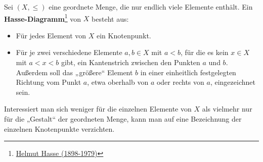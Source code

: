 \begin{defin} \label{def:hasse} 
    Sei $(X,\le)$ eine geordnete Menge, die nur endlich viele Elemente enthält. Ein \textbf{Hasse-Diagramm}\footnote{\href{https://de.wikipedia.org/wiki/Helmut_Hasse}{Helmut Hasse (1898-1979)}} von $X$ besteht aus:
    \begin{itemize}
        \item Für jedes Element von $X$ ein Knotenpunkt.
        \item Für je zwei verschiedene Elemente $a,b\in X$ mit $a<b$, für die es kein $x\in X$ mit $a<x<b$ gibt, ein Kantenstrich zwischen den Punkten $a$ und $b$. Außerdem soll das „größere“ Element $b$ in einer einheitlich festgelegten Richtung vom Punkt $a$, etwa oberhalb von $a$ oder rechts von $a$, eingezeichnet sein.
    \end{itemize}
    Interessiert man sich weniger für die einzelnen Elemente von $X$ als vielmehr nur für die „Gestalt“ der geordneten Menge, kann man auf eine Bezeichnung der einzelnen Knotenpunkte verzichten.
\end{defin}


